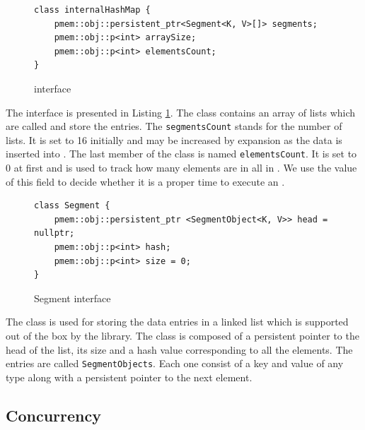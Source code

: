 \begin{figure}[ht]
\renewcommand{\figurename}{Listing}
\begin{lstlisting}
class internalHashMap {
    pmem::obj::persistent_ptr<Segment<K, V>[]> segments;
    pmem::obj::p<int> arraySize;
    pmem::obj::p<int> elementsCount;
}
\end{lstlisting}
\caption{\internalHashMap interface}
\label{internalHashMap}
\end{figure}

        The \internalHashMap interface is presented in Listing \ref{internalHashMap}. 
        The class contains an array of lists which are called \Segments and store the entries.
        The \texttt{segmentsCount} stands for the number of lists. 
        It is set to 16 initially and may be increased by expansion as the data is inserted into \NvmHashMap. 
        The last member of the class is named \texttt{elementsCount}. 
        It is set to 0 at first and is used to track how many elements are in all \Segments in \internalHashMap. 
        We use the value of this field to decide whether it is a proper time to execute an \expandMethod.
        
\begin{figure}[ht]
\renewcommand{\figurename}{Listing}
\begin{lstlisting}
class Segment {
    pmem::obj::persistent_ptr <SegmentObject<K, V>> head = nullptr;
    pmem::obj::p<int> hash;
    pmem::obj::p<int> size = 0;
}
\end{lstlisting}
\caption{Segment interface}
\label{Segment}
\end{figure}

        The \Segment class is used for storing the data entries in a linked list which is supported out of the box by the \libpmemobj library.
        The class is composed of a persistent pointer to the head of the list, its size and a hash value corresponding to all the elements.
        The entries are called \texttt{SegmentObjects}. 
        Each one consist of a key and value of any type along with a persistent pointer to the next element. 
        
        
    \subsection{Concurrency} 
    
